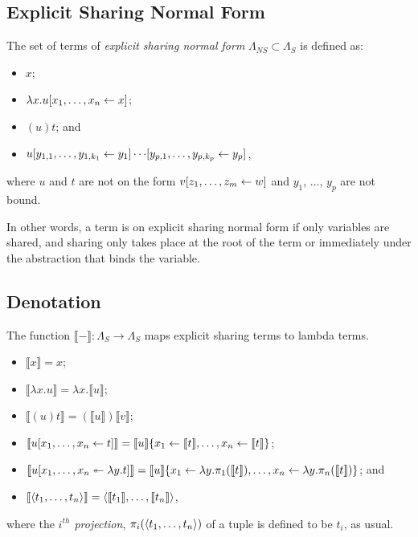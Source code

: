 \documentclass[10pt,a4paper]{article}
\theoremstyle{definition}
\theoremstyle{plain}
\theoremstyle{remark}
\begin{document}
\subsection{Explicit Sharing Normal Form}

The set of terms of \emph{explicit sharing normal form} $\Lambda_{NS}\subset\Lambda_S$ is defined as:

\begin{itemize}
	\item $x$;
	\item $\lambda x.{ { {u}[{{x_1},\dots,{x_n}}\leftarrow{x}] } }$;
	\item $(u)t$; and 
	\item ${ { {{ { {u}[{{y_{1,1}},\dots,{y_{1,k_1}}}\leftarrow{y_1}] } }\cdots}[{{y_{p,1}},\dots,{y_{p,k_p}}}\leftarrow{y_p}] } }$,
\end{itemize}
where $u$ and $t$ are not on the form ${ { {v}[{{z_1},\dots,{z_m}}\leftarrow{w}] } }$ and $y_1$, $\dots$, $y_p$ are not bound.

In other words, a term is on explicit sharing normal form if only variables are shared, and sharing only takes place at the root of the term or immediately under the abstraction that binds the variable.

\subsection{Denotation}

\newcommand{\terden}[1]{{\llbracket{#1}\rrbracket}}
\newcommand{\terpr}[2]{{\pi_{#1}({#2})}}

The function $\terden{-}:\Lambda_S\rightarrow\Lambda_S$ maps explicit sharing terms to lambda terms.

\begin{itemize}
	\item $\terden{x}=x$;
	\item $\terden{\lambda x.u}=\lambda x.\terden{u}$;
	\item $\terden{(u)t}=(\terden{u})\terden{v}$;
	\item $\terden{\tershare{u}{x_1}{x_n}{t}}=\tersubn{\terden{u}}{x_1}{\terden{t}}{x_n}{\terden{t}}$;
	\item $\terden{\terdist{u}{x_1}{x_n}{y}{t}}=\tersubn{\terden{u}}{x_1}{\lambda y.\terpr{1}{\terden{t}}}{x_n}{\lambda y.\terpr{n}{\terden{t}}}$; and
	\item $\terden{\tertuple{t_1}{t_n}}=\tertuple{\terden{t_1}}{\terden{t_n}}$,
\end{itemize}
where the \emph{$i^{th}$ projection}, $\terpr{i}{\tertuple{t_1}{t_n}}$ of a tuple is defined to be $t_i$, as usual.
\end{document}
